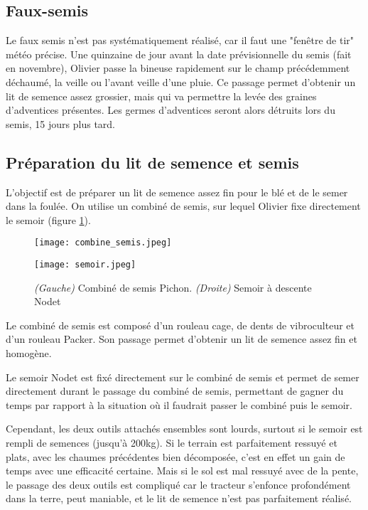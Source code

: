 \documentclass{article}
\begin{document}
\subsection{Faux-semis}

Le faux semis n'est pas systématiquement réalisé, car il faut une "fenêtre de tir" météo précise. Une quinzaine de jour avant la date prévisionnelle du semis (fait en novembre), Olivier passe la bineuse rapidement sur le champ précédemment déchaumé, la veille ou l'avant veille d'une pluie. Ce passage permet d'obtenir un lit de semence assez grossier, mais qui va permettre la levée des graines d'adventices présentes. Les germes d'adventices seront alors détruits lors du semis, 15 jours plus tard.

\subsection{Préparation du lit de semence et semis}

L'objectif est de préparer un lit de semence assez fin pour le blé et de le semer dans la foulée. On utilise un combiné de semis, sur lequel Olivier fixe directement le semoir (figure \ref{fig:semis}). 

\begin{figure}[h!]
\centering
\begin{minipage}{.5\textwidth}
  \centering
  \texttt{[image: combine\_semis.jpeg]}
  \label{fig:test1}
\end{minipage}%
\begin{minipage}{.5\textwidth}
  \centering
  \texttt{[image: semoir.jpeg]}
  \label{fig:test2}
\end{minipage}
\caption{\textit{(Gauche)} Combiné de semis Pichon. \textit{(Droite)} Semoir à descente Nodet}
\label{fig:semis}
\end{figure}

Le combiné de semis est composé d'un rouleau cage, de dents de vibroculteur et d'un rouleau Packer. Son passage permet d'obtenir un lit de semence assez fin et homogène.

Le semoir Nodet est fixé directement sur le combiné de semis et permet de semer directement durant le passage du combiné de semis, permettant de gagner du temps par rapport à la situation où il faudrait passer le combiné puis le semoir. 

Cependant, les deux outils attachés ensembles sont lourds, surtout si le semoir est rempli de semences (jusqu'à 200kg). Si le terrain est parfaitement ressuyé et plats, avec les chaumes précédentes bien décomposée, c'est en effet un gain de temps avec une efficacité certaine. Mais si le sol est mal ressuyé avec de la pente, le passage des deux outils est compliqué car le tracteur s'enfonce profondément dans la terre, peut maniable, et le lit de semence n'est pas parfaitement réalisé. 
\end{document}
